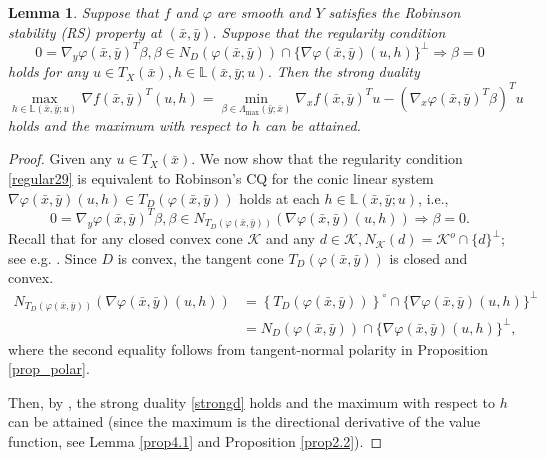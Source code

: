 \documentclass[11pt]{article}
\numberwithin{equation}{section}
\newtheorem{lemma}{Lemma}[section]
\begin{document}
{\begin{lemma}\label{lemma4.5.1}
Suppose that $f$ and $\varphi$ are smooth and $Y$ satisfies the Robinson stability (RS) property at $(\bar x,\bar y)$. 
Suppose that  the regularity condition
\begin{equation}\label{regular29}
0=\nabla_y \varphi(\bar{x},\bar y)^T \beta, \beta \in N_D(\varphi(\bar{x},\bar y)) \cap\{\nabla \varphi(\bar{x},\bar y)(u, h)\}^{\perp} \Longrightarrow \beta=0
\end{equation}
holds for any $u \in T_{ X}(\bar x), h \in \mathbb{L}(\bar x,\bar y;u)$. Then the strong duality 
\begin{equation}\label{strongd}
\max\limits_{h \in \mathbb{L}(\bar x,\bar y;u)} \nabla f(\bar x,\bar y)^T(u,h) = \min\limits_{\beta \in \Lambda_{\max}(\bar y; \bar x)} \nabla_x f(\bar x,\bar y)^Tu - (\nabla_x \varphi(\bar x,\bar y)^T\beta) ^Tu
\end{equation} holds and the maximum with respect to $h$ can be attained.
\end{lemma}
\begin{proof}
Given any $u\in T_X(\bar x)$. We now show that the regularity condition \eqref{regular29} is equivalent to Robinson's CQ for the conic linear system $\nabla \varphi(\bar{x}, \bar y)( u, h) \in T_D(\varphi(\bar x,\bar y))$ holds at each $ h \in \mathbb{L}(\bar x,\bar y;u)$, i.e.,
$$
0=\nabla_y \varphi(\bar{x}, \bar y)^T \beta, \beta \in N_{T_D(\varphi(\bar{x}, \bar y))}(\nabla \varphi(\bar{x}, \bar y)( u, h)) \Longrightarrow \beta=0 .
$$
Recall that for any closed convex cone $\mathcal{K}$ and any $d \in \mathcal{K}, N_{\mathcal{K}}(d)=\mathcal{K}^o \cap\{d\}^{\perp}$; see e.g. \cite[Corollary 23.5.4]{Ro1970}. Since $D$ is convex, the tangent cone $T_D(\varphi(\bar{x}, \bar y))$ is closed and convex.
$$
\begin{aligned}
N_{T_D(\varphi(\bar{x}, \bar y))}(\nabla \varphi(\bar{x}, \bar y)( u, h)) & =\left\{T_D(\varphi(\bar{x}, \bar y))\right\}^{\circ} \cap\{\nabla \varphi(\bar{x}, \bar y)(u, h)\}^{\perp} \\
& =N_D(\varphi(\bar{x}, \bar y)) \cap\{\nabla \varphi(\bar{x}, \bar y)(  u, h)\}^{\perp},
\end{aligned}
$$
where the second equality follows from tangent-normal polarity in Proposition \ref{prop_polar}. 

Then, by \cite[Theorem 2.1]{BaiYe2023}, the strong duality \eqref{strongd} holds 
and the maximum with respect to $h$ can be attained (since the maximum is the directional derivative of the value function, see Lemma \ref{prop4.1} and Proposition \ref{prop2.2}).
\end{proof}


}
\end{document}
